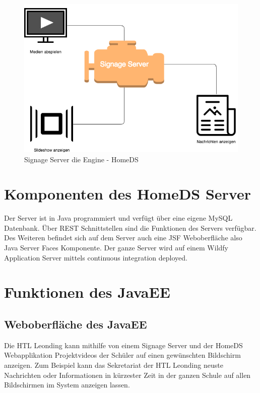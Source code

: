 \begin{figure}[H]
\centering
\includegraphics[width=1\textwidth]{images/08_HomeDsWeb/SignageEngine.png}
\caption{Signage Server die Engine - HomeDS}
\label{img:xiboengine}
\end{figure}
 
\section{Komponenten des HomeDS Server}\label{sec:homedscomponents}
Der Server ist in Java programmiert und verfügt über eine eigene MySQL Datenbank. Über REST Schnittstellen sind die Funktionen des Servers verfügbar. Des Weiteren befindet sich auf dem Server auch eine JSF Weboberfläche also Java Server Faces Komponente. Der ganze Server wird auf einem Wildfy Application Server mittels continuous integration deployed. 
 
\section{Funktionen des JavaEE}
\subsection{Weboberfläche des JavaEE}\label{sec:javaeejsfweb}
Die HTL Leonding kann mithilfe von einem Signage Server und der HomeDS Webapplikation Projektvideos der Schüler auf einen gewünschten Bildschirm anzeigen.  Zum Beispiel kann das Sekretariat der HTL Leonding neuste Nachrichten oder Informationen in kürzester Zeit in der ganzen Schule auf allen Bildschirmen im System anzeigen lassen.

